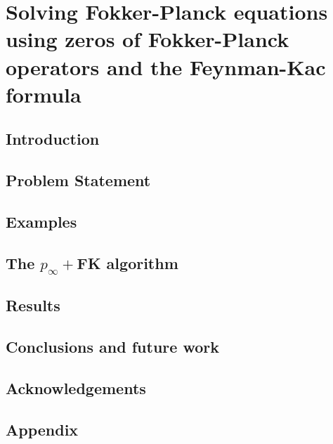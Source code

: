 \chapter{Solving Fokker-Planck equations using zeros of Fokker-Planck operators and the Feynman-Kac formula}
\section{Introduction}
\label{sec-intro--dynamic-fp--dynamic-fp}


\section{Problem Statement}
\label{sec-prob--dynamic-fp--dynamic-fp}


\section{Examples}
\label{sec-example--dynamic-fp--dynamic-fp}


\section{The \texorpdfstring{$p_\infty+$}{Lg}FK algorithm}
\label{sec-algo--dynamic-fp--dynamic-fp}



\section{Results}
\label{sec-results--dynamic-fp--dynamic-fp}



\section{Conclusions and future work}
\label{sec-conclusions--dynamic-fp--dynamic-fp}


\section*{Acknowledgements}


\section{Appendix}
\label{sec-appendix--dynamic-fp--dynamic-fp}





